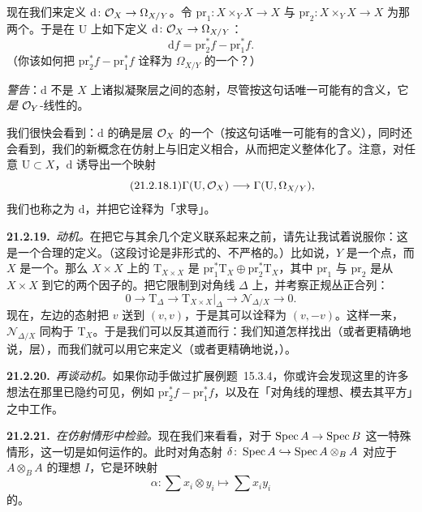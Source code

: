 现在我们来定义 $\mathrm{d}\colon\mathcal{O}_X\to\Omega_{X/Y}$。令 $\mathrm{pr}_1\colon X\times_YX\to X$ 与 $\mathrm{pr}_2\colon X\times_YX\to X$ 为那两个\trProjection。于是在\trOpenSet{} $\mathrm{U}$ 上如下定义 $\mathrm{d}\colon\mathcal{O}_X\to\Omega_{X/Y}$：
\[
\mathrm{d}f=\mathrm{pr}_2^*f-\mathrm{pr}_1^*f.
\]
（你该如何把 $\mathrm{pr}_2^*f-\mathrm{pr}_1^*f$ 诠释为 $\Omega_{X/Y}$ 的一个\trSection？）

\emph{警告}：$\mathrm{d}$ 不是 $X$ 上诸拟凝聚层之间的态射，尽管按这句话唯一可能有的含义，它\emph{是} $\mathcal{O}_Y$-线性的。

我们很快会看到：$\mathrm{d}$ 的确是层 $\mathcal{O}_X$ 的一个\trDerivation（按这句话唯一可能有的含义），同时还会看到，我们的新\trDifferential{}概念在仿射\trOpenSet{}上与旧定义相合，从而把定义整体化了。注意，对任意\trOpenSubset{} $\mathrm{U}\subset X$，$\mathrm{d}$ 诱导出一个映射
\begin{equation*}\tag{21.2.18.1}\label{eq:global-d-sections}
\Gamma(\mathrm{U},\mathcal{O}_X)\longrightarrow\Gamma(\mathrm{U},\Omega_{X/Y}),
\end{equation*}
我们也称之为 $\mathrm{d}$，并把它诠释为「求导」。

\textbf{21.2.19.}\ \emph{动机。}\quad 在把它与其余几个定义联系起来之前，请先让我试着说服你：这是一个合理的定义。（这段讨论是非形式的、不严格的。）比如说，$Y$ 是一个点，而 $X$ 是一个\trManifold。那么 $X\times X$ 上的\trTangentBundle{} $\mathrm{T}_{X\times X}$ 是 $\mathrm{pr}_1^*\mathrm{T}_X\oplus\mathrm{pr}_2^*\mathrm{T}_X$，其中 $\mathrm{pr}_1$ 与 $\mathrm{pr}_2$ 是从 $X\times X$ 到它的两个因子的\trProjection。把它限制到对角线 $\Delta$ 上，并考察正规丛正合列：
\[
0\longrightarrow\mathrm{T}_\Delta\longrightarrow\mathrm{T}_{X\times X}|_\Delta\longrightarrow\mathscr{N}_{\Delta/X}\longrightarrow 0.
\]
现在，左边的态射把 $v$ 送到 $(v,v)$，于是其\trCokernel{}可以诠释为 $(v,-v)$。这样一来，$\mathscr{N}_{\Delta/X}$ 同构于 $\mathrm{T}_X$。于是我们可以反其道而行：我们知道怎样找出\trNormalBundle{}（或者更精确地说，\trConormal{}层），而我们就可以用它来定义\trTangentBundle{}（或者更精确地说，\trCotangentSheaf）。

\textbf{21.2.20.}\ \emph{再谈动机。}\quad 如果你动手做过\mbox{扩展例题~15.3.4}，你或许会发现这里的许多想法在那里已隐约可见，例如 $\mathrm{pr}_2^*f-\mathrm{pr}_1^*f$，以及在「对角线的理想、模去其平方」之中工作。

\textbf{21.2.21.}\ \emph{在仿射情形中检验。}\quad 现在我们来看看，对于 $\operatorname{Spec} A\to\operatorname{Spec} B$ 这一特殊情形，这一切是如何运作的。此时对角态射 $\delta\colon\operatorname{Spec} A\hookrightarrow\operatorname{Spec} A\otimes_BA$ 对应于 $A\otimes_BA$ 的理想 $I$，它是环映射
\[
\alpha\colon\sum x_i\otimes y_i\longmapsto\sum x_iy_i
\]
的\trKernel。

